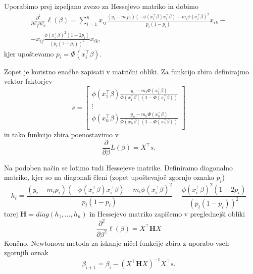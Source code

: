 \documentclass[12pt,a4paper]{amsart}
\theoremstyle{definition} %
\theoremstyle{plain} %
\begin{document}
Uporabimo prej izpeljano zvezo  za Hessejevo matriko in dobimo
\begin{multline*}
    \frac{\partial^2}{\partial\beta_{j}\partial\beta_{k}}\ell(\beta) = \sum_{i = 1}^{n}
    x_{ij}\frac{(y_{i}-m_{i}p_{i})(-\phi(x_{i}^\top\beta)x_{i}^\top\beta) - m_{i}\phi(x_{i}^\top\beta)^2}{p_{i}(1-p_{i})}x_{ik} - \\
    -x_{ij}\frac{\phi(x_{i}^\top\beta)^2(1-2p_{i})}{(p_{i}(1-p_{i}))^2}x_{ik},
\end{multline*}
kjer upoštevamo $p_{i} = \Phi(x_{i}^\top\beta).$

Zopet je koristno enačbe zapisati v matrični obliki. Za funkcijo zbira definirajmo vektor faktorjev
\[
    s = \begin{bmatrix}
        \phi(x_{1}^\top\beta)\frac{y_{1}-m_{1}\Phi(x_{1}^\top\beta)}{\Phi(x_{1}^\top\beta)(1-\Phi(x_{1}^\top\beta))} \\
        \vdots \\
        \phi(x_{n}^\top\beta)\frac{y_{n}-m_{n}\Phi(x_{n}^\top\beta)}{\Phi(x_{n}^\top\beta)(1-\Phi(x_{n}^\top\beta))} \\
    \end{bmatrix}
\]
in tako funkcijo zbira poenostavimo v
\[
    \frac{\partial}{\partial\beta}L(\beta) = X^\top s.
\]

Na podoben način se lotimo tudi Hessejeve matrike. Definiramo diagonalno matriko, kjer so na diagonali členi (zopet upoštevajoč zgornjo oznako $p_{i}$)
\[
    h_{i} = \frac{(y_{i}-m_{i}p_{i})(-\phi(x_{i}^\top\beta)x_{i}^\top\beta) - m_{i}\phi(x_{i}^\top\beta)^2}{p_{i}(1-p_{i})}
    -\frac{\phi(x_{i}^\top\beta)^2(1-2p_{i})}{(p_{i}(1-p_{i}))^2}
\]
torej $\mathbf{H} = diag(h_{1},\ldots,h_{n})$ in Hessejevo matriko zapišemo v preglednejši obliki
\[
    \frac{\partial^2}{\partial\beta^2} \ell(\beta) = X^\top \mathbf{H}X
\]
Končno, Newtonova metoda za iskanje ničel funkcije zbira z uporabo vseh zgornjih oznak
\begin{equation}
    \beta_{i+1} = \beta_{i} - (X^\top \mathbf{H} X)^{-1}X^\top s.
\end{equation}
\end{document}

